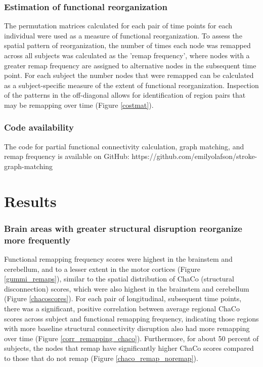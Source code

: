 \documentclass[10pt]{article}
\begin{document}
	\subsubsection*{Estimation of functional reorganization}
	The permutation matrices calculated for each pair of time points for each individual were used as a measure of functional reorganization. To assess the spatial pattern of reorganization, the number of times each node was remapped across all subjects was calculated as the 'remap frequency’, where nodes with a greater remap frequency are assigned to alternative nodes in the subsequent time point. For each subject the number nodes that were remapped can be calculated as a subject-specific measure of the extent of functional reorganization. Inspection of the patterns in the off-diagonal allows for identification of region pairs that may be remapping over time (Figure \ref{costmat}).
	
	\subsubsection*{Code availability}
	 The code for partial functional connectivity calculation, graph matching, and remap frequency is available on GitHub: https://github.com/emilyolafson/stroke-graph-matching
	
\section*{Results}
	\subsubsection*{Brain areas with greater structural disruption reorganize more frequently}
	Functional remapping frequency scores were highest in the brainstem and cerebellum, and to a lesser extent in the motor cortices (Figure \ref{gummi_remaps}), similar to the spatial distribution of ChaCo (structural disconnection) scores, which were also highest in the brainstem and cerebellum (Figure \ref{chacoscores}). For each pair of longitudinal, subsequent time points, there was a significant, positive correlation between average regional ChaCo scores across subject and functional remapping frequency, indicating those regions with more baseline structural connectivity disruption also had more remapping over time (Figure \ref{corr_remapping_chaco}).
	Furthermore, for about 50 percent of subjects, the nodes that remap have significantly higher ChaCo scores compared to those that do not remap (Figure \ref{chaco_remap_noremap}).
\end{document}
